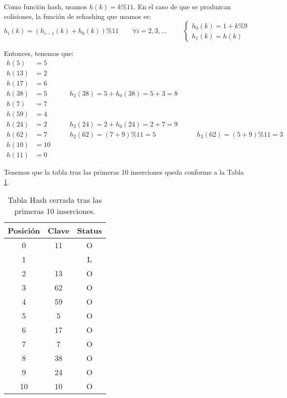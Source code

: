 \begin{ejercicio}
\begin{enumerate}
        Como función hash, usamos $h(k)=k\% 11$. En el caso de que se produzcan colisiones, la función de rehashing que usamos es:
        \begin{equation*}
            h_i(k)=(h_{i-1}(k)+h_0(k))\% 11 \qquad \forall i=2,3,\dots \hspace{1cm} \left\{\begin{array}{l}
                h_0(k) =1+k\%9 \\
                h_1(k) = h(k)
            \end{array}\right.
        \end{equation*}

        Entonces, tenemos que:
        \begin{equation*}
            \begin{array}{rlll}
                h(5)&=5\\
                h(13)&=2\\
                h(17)&=6 \\
                h(38)&=5 &\qquad h_2(38)=5+h_0(38)=5+3=8\\
                h(7)&=7\\
                h(59)&=4\\
                h(24)&=2 &\qquad h_2(24)=2+h_0(24)=2+7=9\\
                h(62)&=7 &\qquad h_2(62)=(7+9)\%11=5 &\qquad h_3(62)=(5+9)\%11 = 3\\
                h(10)&=10\\
                h(11)&=0
            \end{array}
        \end{equation*}

        Tenemos que la tabla tras las primeras 10 inserciones queda conforme a la Tabla \ref{fig:TablaHashInicial}.
        \begin{table}
            \centering
            \begin{tabular}{c|c|c}
            Posición & Clave & Status \\ \hline \hline
            0        & 11       & O      \\
            1        &          & L      \\
            2        & 13       & O      \\
            3        & 62       & O      \\
            4        & 59       & O      \\
            5        & 5        & O      \\
            6        & 17       & O      \\
            7        & 7        & O      \\
            8        & 38       & O      \\
            9        & 24       & O      \\
            10       & 10       & O     
            \end{tabular}
            \caption{Tabla Hash cerrada tras las primeras 10 inserciones.}
            \label{fig:TablaHashInicial}
        \end{table}


\end{enumerate}
\end{ejercicio}
